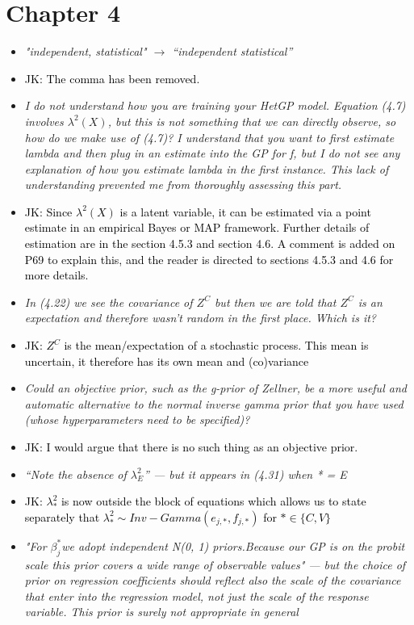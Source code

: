 \documentclass[12pt]{article}
\newcommand{\done}[2]{\item[#1]\textit{#2}}
\newcommand{\jack}[1]{\item{\textcolor{black}{JK: #1}}}
\begin{document}
\section{Chapter 4}
\begin{itemize}
\done{P67}{"independent, statistical" $\to$ ``independent statistical''}

\jack{The comma has been removed.}

\done{P69}{I do not understand how you are training your HetGP model.  Equation (4.7) involves $\lambda^2 (X)$, but this is not something that we can directly observe, so how do we make use of (4.7)?  I understand that you want to first estimate lambda and then plug in an estimate into the GP for f, but I do not see any explanation of how you estimate lambda in the first instance.  This lack of understanding prevented me from thoroughly assessing this part.}

\jack{Since $\lambda^2(X)$ is a latent variable, it can be estimated via a point estimate in an empirical Bayes or MAP framework. Further details of estimation are in the section 4.5.3 and section 4.6. A comment is added on P69 to explain this, and the reader is directed to sections 4.5.3 and 4.6 for more details.}

\done{P78}{In (4.22) we see the covariance of $Z^C$ but then we are told that $Z^C$ is an expectation and therefore wasn't random in the first place.  Which is it?}

\jack{$Z^C$ is the mean/expectation of a stochastic process. This mean is uncertain, it therefore has its own mean and (co)variance}

\done{P79}{Could an objective prior, such as the g-prior of Zellner, be a more useful and automatic alternative to the normal inverse gamma prior that you have used (whose hyperparameters need to be specified)?}

\jack{I would argue that there is no such thing as an objective prior.}

\done{P79}{``Note the absence of $\lambda^2_E$'' --- but it appears in (4.31) when * = E}

\jack{$\lambda^2_{*}$ is now outside the block of equations which allows us to state separately that $\lambda^2_{*} \sim Inv-Gamma(e_{j, *}, f_{j, *})$ for $* \in \{ C, V \}$}

\done{P79}{"For $\beta^{*}_{j}$we adopt independent N(0, 1) priors.Because our GP is on the probit scale this prior covers a wide range of observable values" --- but the choice of prior on regression coefficients should reflect also the scale of the covariance that enter into the regression model, not just the scale of the response variable.  This prior is surely not appropriate in general}


\end{itemize}
\end{document}
